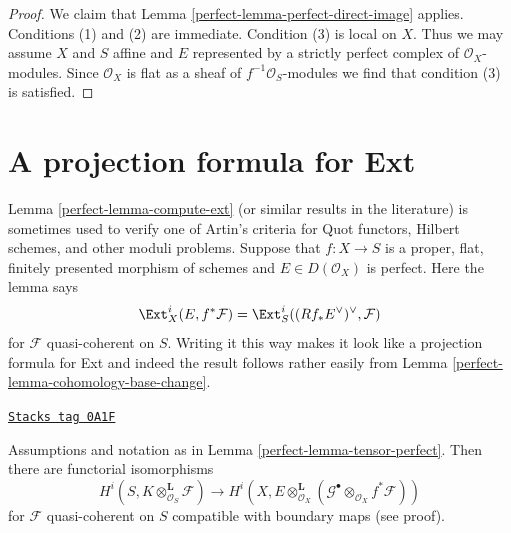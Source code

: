\begin{proof}

We claim that Lemma \ref{perfect-lemma-perfect-direct-image} applies.
Conditions (1) and (2) are immediate. Condition (3) is local
on $X$. Thus we may assume $X$ and $S$ affine and $E$
represented by a strictly perfect complex of $\mathcal{O}_X$-modules.
Since $\mathcal{O}_X$ is flat as a sheaf of $f^{-1}\mathcal{O}_S$-modules
we find that condition (3) is satisfied.
\end{proof}

\section{A projection formula for Ext}
\label{perfect-section-ext}
Lemma \ref{perfect-lemma-compute-ext} (or similar results in the literature)
is sometimes used to verify one of Artin's criteria for
Quot functors, Hilbert schemes, and other moduli problems.
Suppose that $f : X \to S$ is a proper, flat, finitely presented
morphism of schemes and $E \in D(\mathcal{O}_X)$ is perfect.
Here the lemma says
$$
\Ext^i_X(E, f^*\mathcal{F}) =
\Ext^i_S((Rf_*E^\vee)^\vee, \mathcal{F})
$$
for $\mathcal{F}$ quasi-coherent on $S$.
Writing it this way makes it look like a projection formula
for Ext and indeed the result follows rather
easily from Lemma \ref{perfect-lemma-cohomology-base-change}.

\begin{lemma}
\label{perfect-lemma-compute-tensor-perfect}
\href{https://stacks.math.columbia.edu/tag/0A1F}{\texttt{Stacks tag 0A1F}}

Assumptions and notation as in Lemma \ref{perfect-lemma-tensor-perfect}.
Then there are functorial isomorphisms
$$
H^i(S, K \otimes^\mathbf{L}_{\mathcal{O}_S} \mathcal{F})
\longrightarrow
H^i(X, E \otimes_{\mathcal{O}_X}^\mathbf{L}
(\mathcal{G}^\bullet \otimes_{\mathcal{O}_X} f^*\mathcal{F}))
$$
for $\mathcal{F}$ quasi-coherent on $S$
compatible with boundary maps (see proof).
\end{lemma}

